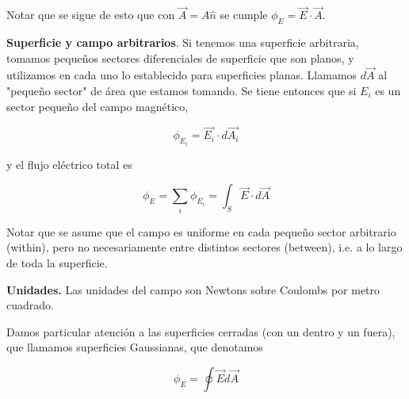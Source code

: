 \documentclass[12pt]{article}
\theoremstyle{definition}
\begin{document}
Notar que se sigue de esto que con $\vec{A} = A \hat{n}$ se cumple $\phi_E =
\vec{E} \cdot \vec{A}$.

\textbf{Superficie y campo arbitrarios}. Si tenemos una superficie arbitraria,
tomamos pequeños sectores diferenciales de superficie que son planos, y
utilizamos en cada uno lo establecido para superficies planas. Llamamos
$d\vec{A}$ al "pequeño sector" de área que estamos tomando. Se tiene entonces
que si $E_i$ es un sector pequeño del campo magnético,

\begin{equation*}
    \phi_{E_i} = \vec{E_i} \cdot d\vec{A_i}
\end{equation*}

y el flujo eléctrico total es 

\begin{equation*}
    \phi_E = \sum_{i} \phi_{E_i} = \int_S \vec{E} \cdot d\vec{A}
\end{equation*}

Notar que se asume que el campo es uniforme en cada pequeño sector arbitrario
(within), pero no necesariamente entre distintos sectores (between), i.e. a lo
largo de toda la superficie.

\textbf{Unidades.} Las unidades del campo son Newtons sobre Coulombs por metro
cuadrado.

Damos particular atención a las superficies cerradas (con un dentro y un fuera),
que llamamos superficies Gaussianas, que denotamos 

\begin{equation*}
    \phi_E = \oint \vec{E} d\vec{A}
\end{equation*}
\end{document}
